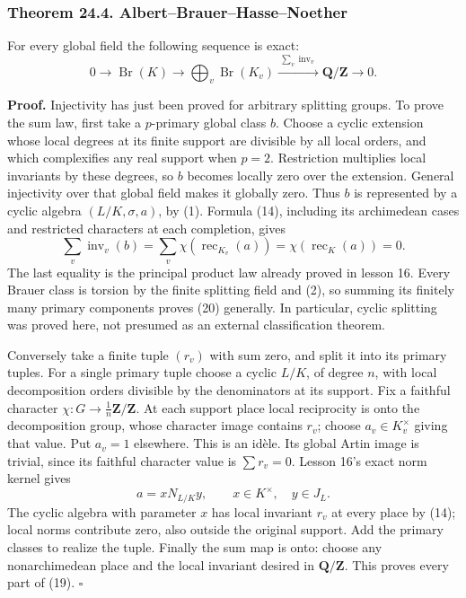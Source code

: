 \documentclass[11pt,a4paper]{article}
\begin{document}
\subsubsection{Theorem 24.4.
Albert--Brauer--Hasse--Noether}\label{theorem-24.4.-albertbrauerhassenoether}

For every global field the following sequence is exact: \[
0\longrightarrow\operatorname{Br}(K)
\longrightarrow\bigoplus_v\operatorname{Br}(K_v)
\xrightarrow{\ \sum_v\operatorname{inv}_v\ }\mathbf Q/\mathbf Z
\longrightarrow0.
\tag{19}
\]

\textbf{Proof.} Injectivity has just been proved for arbitrary splitting
groups. To prove the sum law, first take a \(p\)-primary global class
\(b\). Choose a cyclic extension whose local degrees at its finite
support are divisible by all local orders, and which complexifies any
real support when \(p=2\). Restriction multiplies local invariants by
these degrees, so \(b\) becomes locally zero over the extension. General
injectivity over that global field makes it globally zero. Thus \(b\) is
represented by a cyclic algebra \((L/K,\sigma,a)\), by (1). Formula
(14), including its archimedean cases and restricted characters at each
completion, gives \[
\sum_v\operatorname{inv}_v(b)
=\sum_v\chi(\operatorname{rec}_{K_v}(a))
=\chi(\operatorname{rec}_K(a))=0.
\tag{20}
\] The last equality is the principal product law already proved in
lesson 16. Every Brauer class is torsion by the finite splitting field
and (2), so summing its finitely many primary components proves (20)
generally. In particular, cyclic splitting was proved here, not presumed
as an external classification theorem.

Conversely take a finite tuple \((r_v)\) with sum zero, and split it
into its primary tuples. For a single primary tuple choose a cyclic
\(L/K\), of degree \(n\), with local decomposition orders divisible by
the denominators at its support. Fix a faithful character
\(\chi:G\to\tfrac1n\mathbf Z/\mathbf Z\). At each support place local
reciprocity is onto the decomposition group, whose character image
contains \(r_v\); choose \(a_v\in K_v^\times\) giving that value. Put
\(a_v=1\) elsewhere. This is an idèle. Its global Artin image is
trivial, since its faithful character value is \(\sum r_v=0\). Lesson
16's exact norm kernel gives \[
a=xN_{L/K}y,\qquad x\in K^\times,\quad y\in J_L.
\] The cyclic algebra with parameter \(x\) has local invariant \(r_v\)
at every place by (14); local norms contribute zero, also outside the
original support. Add the primary classes to realize the tuple. Finally
the sum map is onto: choose any nonarchimedean place and the local
invariant desired in \(\mathbf Q/\mathbf Z\). This proves every part of
(19). \(\square\)
\end{document}
